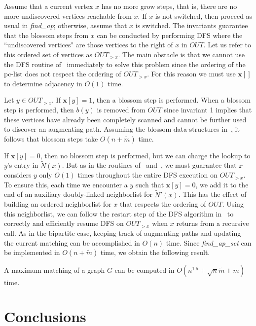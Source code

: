 \documentclass{llncs}
\begin{document}
Assume that a current vertex $x$ has no more grow steps, that is, there are no more undiscovered vertices reachable from $x$.
If $x$ is not switched, then proceed as usual in \emph{find\_ap}; otherwise, assume that $x$ is switched.
The invariants guarantee that the blossom steps from $x$ can be conducted by performing DFS where the ``undiscovered vertices" are those vertices to the right of $x$ in $OUT$.  Let us refer to this ordered set of vertices as $OUT_{>x}$.  The main obstacle is that we cannot use the DFS routine of~\cite{LindzeyO13} immediately to solve this problem since the ordering of the pc-list does not respect the ordering of $OUT_{>x}$.  For this reason we must use $\mathbf{x}[]$ to determine adjacency in $O(1)$ time.  

Let $y \in OUT_{>x}$.  If $\mathbf{x}[y] = 1$, then a blossom step is performed. When a blossom step is performed, then $b(y)$ is removed from $OUT$ since invariant 1 implies that these vertices have already been completely scanned and cannot be further used to discover an augmenting path.  Assuming the blossom data-structures in~\cite{GabowT91}, it follows that blossom steps take $O(n+\widetilde{m})$ time.  

If $\mathbf{x}[y] = 0$, then no blossom step is performed, but we can charge the lookup to $y$'s entry in $\widetilde{N}(x)$.  But as in the routines of~\cite{DahlhausGM02} and~\cite{LindzeyO13}, we must guarantee that $x$ considers $y$ only $O(1)$ times throughout the entire DFS execution on $OUT_{>x}$.  To ensure this, each time we encounter a $y$ such that $\mathbf{x}[y] = 0$, we add it to the end of an auxiliary doubly-linked neighborlist for $\widetilde{N}'(x)$.  This has the effect of building an ordered neighborlist for $x$ that respects the ordering of $OUT$.  Using this neighborlist, we can follow the restart step of the DFS algorithm in~\cite{LindzeyO13} to correctly and efficiently resume DFS on $OUT_{>x}$ when $x$ returns from a recursive call. As in the bipartite case, keeping track of augmenting paths and updating the current matching can be accomplished in $O(n)$ time.  Since \emph{find\_ap\_set} can be implemented in $O(n + \widetilde{m})$ time, we obtain the following result.

\begin{theorem}\label{thm:maxmatch}
A maximum matching of a graph $G$ can be computed in $O(n^{1.5}+\sqrt{n}\widetilde{m} +m)$ time.
\end{theorem}

\section{Conclusions}
\end{document}

